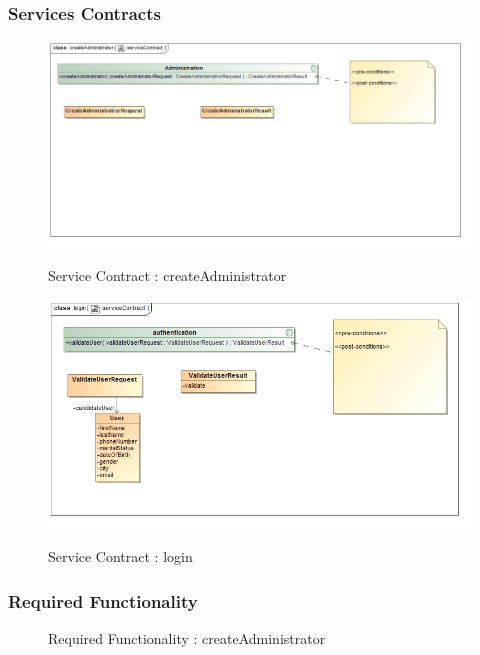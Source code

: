 \documentclass{article}
\begin{document}
		\subsubsection{Services Contracts}

		\begin{figure}[H]
		\includegraphics[width=\textwidth]{images/class__createAdministrator__serviceContract.jpg}  \\
		\caption{Service Contract : createAdministrator}
		\end{figure}

		\begin{figure}[H]
		\includegraphics[width=\textwidth]{images/class__login__serviceContract.jpg}  \\
		\caption{Service Contract : login}
		\end{figure}

		\subsubsection{Required Functionality}

		\begin{figure}[H]
		\caption{Required Functionality : createAdministrator}
		\end{figure}
\end{document}
